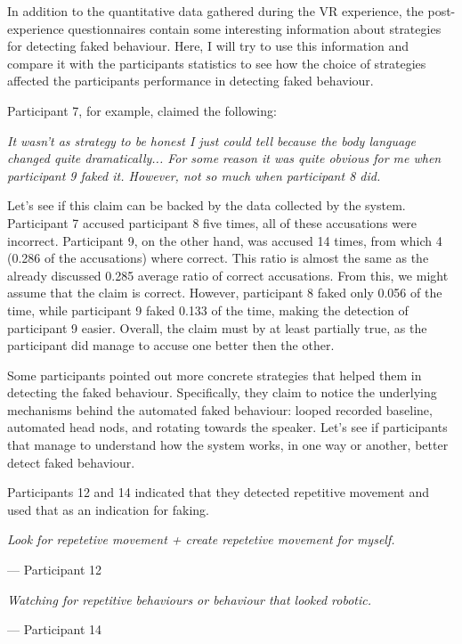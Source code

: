 \documentclass[]{simple-thesis}
\begin{document}
In addition to the quantitative data gathered during the VR experience, the post-experience questionnaires contain some interesting information about strategies for detecting faked behaviour.
Here, I will try to use this information and compare it with the participants statistics to see how the choice of strategies affected the participants performance in detecting faked behaviour.

Participant 7, for example, claimed the following:

\begin{displayquote}
  \textit{
    It wasn't as strategy to be honest I just could tell because the body language changed quite dramatically...
    For some reason it was quite obvious for me when participant 9 faked it.
    However, not so much when participant 8 did.
  }
\end{displayquote}

Let's see if this claim can be backed by the data collected by the system.
Participant 7 accused participant 8 five times, all of these accusations were incorrect.
Participant 9, on the other hand, was accused 14 times, from which 4 (0.286 of the accusations) where correct.
This ratio is almost the same as the already discussed 0.285 average ratio of correct accusations.
From this, we might assume that the claim is correct.
However, participant 8 faked only 0.056 of the time, while participant 9 faked 0.133 of the time, making the detection of participant 9 easier.
Overall, the claim must by at least partially true, as the participant did manage to accuse one better then the other.

Some participants pointed out more concrete strategies that helped them in detecting the faked behaviour.
Specifically, they claim to notice the underlying mechanisms behind the automated faked behaviour: looped recorded baseline, automated head nods, and rotating towards the speaker.
Let's see if participants that manage to understand how the system works, in one way or another, better detect faked behaviour.

Participants 12 and 14 indicated that they detected repetitive movement and used that as an indication for faking.

\begin{displayquote}
  \textit{Look for repetetive movement + create repetetive movement for myself.}

  \hfill
  --- Participant 12

  \textit{Watching for repetitive behaviours or behaviour that looked robotic.}

  \hfill
  --- Participant 14
\end{displayquote}
\end{document}
